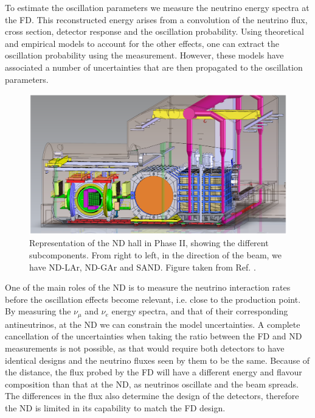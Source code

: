 To estimate the oscillation parameters we measure the neutrino energy spectra at the FD. This reconstructed energy arises from a convolution of the neutrino flux, cross section, detector response and the oscillation probability. Using theoretical and empirical models to account for the other effects, one can extract the oscillation probability using the measurement. However, these models have associated a number of uncertainties that are then propagated to the oscillation parameters.

\begin{figure}[t]
	\centering
	\includegraphics[width=0.95\linewidth]{Images/DUNE/ND/nd_hall}
	\caption[Representation of the ND hall in Phase II, showing the different subcomponents.]{Representation of the ND hall in Phase II, showing the different subcomponents. From right to left, in the direction of the beam, we have ND-LAr, ND-GAr and SAND. Figure taken from Ref. \cite{DUNE2021NDCDR}.}
	\label{fig:dune_nd}
\end{figure}

One of the main roles of the ND is to measure the neutrino interaction rates before the oscillation effects become relevant, i.e. close to the production point. By measuring the $\nu_{\mu}$ and $\nu_{e}$ energy spectra, and that of their corresponding antineutrinos, at the ND we can constrain the model uncertainties. A complete cancellation of the uncertainties when taking the ratio between the FD and ND measurements is not possible, as that would require both detectors to have identical designs and the neutrino fluxes seen by them to be the same. Because of the distance, the flux probed by the FD will have a different energy and flavour composition than that at the ND, as neutrinos oscillate and the beam spreads. The differences in the flux also determine the design of the detectors, therefore the ND is limited in its capability to match the FD design.

